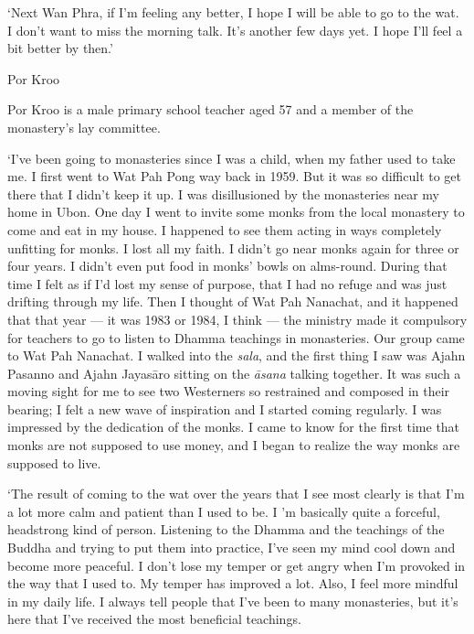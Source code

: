 `Next Wan Phra, if I'm feeling any better, I hope I will be able to go
to the wat. I don't want to miss the morning talk. It's another few days
yet. I hope I'll feel a bit better by then.'

Por Kroo

Por Kroo is a male primary school teacher aged 57 and a member of the
monastery's lay committee.

`I've been going to monasteries since I was a child, when my father used
to take me. I first went to Wat Pah Pong way back in 1959. But it was so
difficult to get there that I didn't keep it up. I was disillusioned by
the monasteries near my home in Ubon. One day I went to invite some
monks from the local monastery to come and eat in my house. I happened
to see them acting in ways completely unfitting for monks. I lost all my
faith. I didn't go near monks again for three or four years. I didn't
even put food in monks' bowls on alms-round. During that time I felt as
if I'd lost my sense of purpose, that I had no refuge and was just
drifting through my life. Then I thought of Wat Pah Nanachat, and it
happened that that year --- it was 1983 or 1984, I think --- the
ministry made it compulsory for teachers to go to listen to Dhamma
teachings in monasteries. Our group came to Wat Pah Nanachat. I walked
into the \emph{sala}, and the first thing I saw was Ajahn Pasanno and
Ajahn Jayasāro sitting on the \emph{āsana} talking together. It was such
a moving sight for me to see two Westerners so restrained and composed
in their bearing; I felt a new wave of inspiration and I started coming
regularly. I was impressed by the dedication of the monks. I came to
know for the first time that monks are not supposed to use money, and I
began to realize the way monks are supposed to live.

`The result of coming to the wat over the years that I see most clearly
is that I'm a lot more calm and patient than I used to be. I 'm
basically quite a forceful, headstrong kind of person. Listening to the
Dhamma and the teachings of the Buddha and trying to put them into
practice, I've seen my mind cool down and become more peaceful. I don't
lose my temper or get angry when I'm provoked in the way that I used to.
My temper has improved a lot. Also, I feel more mindful in my daily
life. I always tell people that I've been to many monasteries, but it's
here that I've received the most beneficial teachings.

